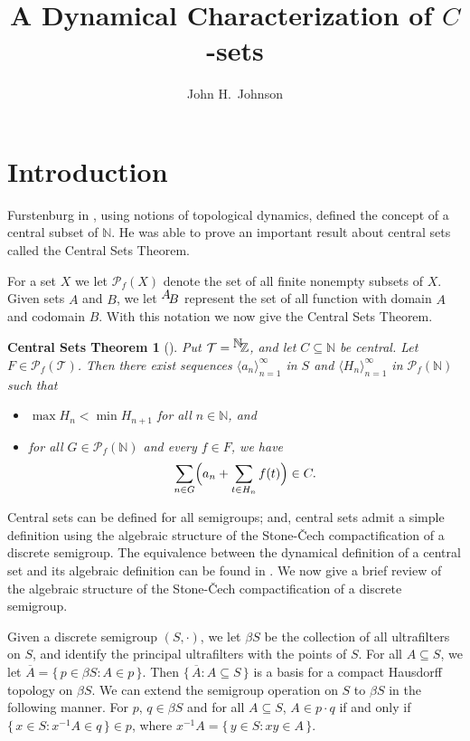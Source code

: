 \documentclass[12pt]{article}
\title{A Dynamical Characterization of $C$-sets}
\author{John H.~Johnson}
\date{}
\theoremstyle{plain}
\newtheorem{OCST}[thm]{ Central Sets Theorem}
\theoremstyle{definition}
\newcommand{\la}{\langle}
\newcommand{\ra}{\rangle}
\newcommand{\bbN}{\mathbb{N}}
\newcommand{\bbZ}{\mathbb{Z}}
\newcommand{\setfunc}[2]{\hbox{${}^{\hbox{$#1$}}\hskip -2 pt #2$}}
\newcommand{\Pf}{\mathcal{P}_f}
\begin{document}
\maketitle
\section{Introduction}
Furstenburg in \cite[Chapter 8]{Furstenberg:1981fk}, using notions of
topological dynamics, defined the concept of a central subset of
$\bbN$.
He was able to prove an important result about central sets
called the Central Sets Theorem.

For a set $X$ we let $\Pf(X)$ denote the set of all finite nonempty
subsets of $X$.
Given sets $A$ and $B$, we let $\setfunc{A}{B}$ represent the set of
all function with domain $A$ and codomain $B$. 
With this notation we now give the Central Sets Theorem.
\begin{OCST}[{\cite[Theorem 8.21]{Furstenberg:1981fk}}]
  Put $\mathcal{T} =
  \setfunc{\bbN}{\bbZ}$, and let $C \subseteq \bbN$ be central.
  Let $F \in \mathcal{P}_f(\mathcal{T})$. 
  Then there exist sequences $\la a_n \ra_{n=1}^\infty$ in $S$ and
  $\la H_n \ra_{n=1}^\infty$ in $\mathcal{P}_f(\bbN)$ such that
    \begin{itemize}
      \item[(1)] $\max H_n < \min H_{n+1}$ for all $n \in \bbN$, and
      \item[(2)] for all $G \in \mathcal{P}_f(\bbN)$ and every $f
        \in F$, we have
        \[
          \sum_{n \in G}\Bigl(a_n + \sum_{t \in H_n} f(t)\Bigr) \in C.
        \]
    \end{itemize}
\end{OCST}

Central sets can be defined for all semigroups; and, central sets
admit a simple definition using the algebraic structure of the
Stone-\v{C}ech compactification of a discrete semigroup. 
The equivalence between the dynamical definition of a central set and
its algebraic definition can be found in \cite[Chapter
19]{Hindman:1998fk}.
We now give a brief review of the algebraic structure of the
Stone-\v{C}ech compactification of a discrete semigroup.

Given a discrete semigroup $(S, \cdot)$, we let $\beta S$ be the
collection of all ultrafilters on $S$, and identify the principal
ultrafilters with the points of $S$. 
For all $A \subseteq S$, we let $\overline{A} = \{\, p \in \beta S : A
\in p\,\}$. 
Then $\{\, \overline{A} : A \subseteq S \,\}$ is a basis for a compact
Hausdorff topology on $\beta S$. 
We can extend the semigroup operation on $S$ to $\beta S$ in the
following manner.
For $p$, $q \in \beta S$ and for all $A \subseteq S$, $A \in p \cdot
q$ if and only if $\{\, x \in S: x^{-1}A \in q \,\} \in p$, where
$x^{-1}A = \{\, y \in S : xy \in A \,\}$. 
\end{document}
